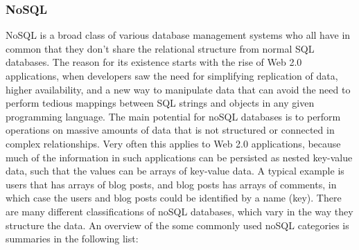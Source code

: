 \subsubsection{NoSQL}
NoSQL is a broad class of various database management systems who all have in common that they don't share the relational structure from normal SQL databases. The reason for its existence starts with the rise of Web 2.0 applications, when developers saw the need for simplifying replication of data, higher availability, and a new way to manipulate data that can avoid the need to perform tedious mappings between SQL strings and objects in any given programming language. The main potential for noSQL databases is to perform operations on massive amounts of data that is not structured or connected in complex relationships. Very often this applies to Web 2.0 applications, because much of the information in such applications can be persisted as nested key-value data, such that the values can be arrays of key-value data. A typical example is users that has arrays of blog posts, and blog posts has arrays of comments, in which case the users and blog posts could be identified by a name (key). There are many different classifications of noSQL databases, which vary in the way they structure the data. An overview of the some commonly used noSQL categories is summaries in the following list:
